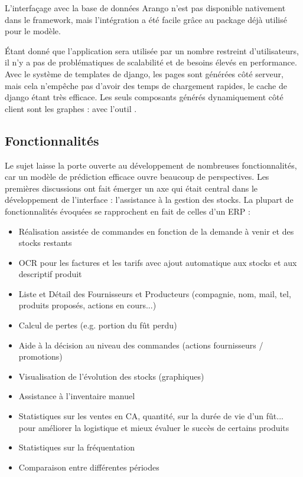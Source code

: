 L'interfaçage avec la base de données Arango n’est pas disponible nativement dans le framework, mais l’intégration a été facile grâce au package  déjà utilisé pour le modèle.

Étant donné que l’application sera utilisée par un nombre restreint d’utilisateurs, il n’y a pas de problématiques de scalabilité et de besoins élevés en performance. Avec le système de templates de django, les pages sont générées côté serveur, mais cela n’empêche pas d’avoir des temps de chargement rapides, le cache de django étant très efficace. Les seuls composants générés dynamiquement côté client sont les graphes : avec l'outil .

\subsection{Fonctionnalités}
\label{subsec:ui_features}

Le sujet laisse la porte ouverte au développement de nombreuses fonctionnalités, car un modèle de prédiction efficace ouvre beaucoup de perspectives. Les premières discussions ont fait émerger un axe qui était central dans le développement de l'interface : l'assistance à la gestion des stocks. La plupart de fonctionnalités évoquées se rapprochent en fait de celles d'un ERP :

\begin{itemize}
    \item Réalisation assistée de commandes en fonction de la demande à venir et des stocks restants
    \item OCR pour les factures et les tarifs avec ajout automatique aux stocks et aux descriptif produit
    \item Liste et Détail des Fournisseurs et Producteurs (compagnie, nom, mail, tel, produits proposés, actions en cours...)
    \item Calcul de pertes (e.g. portion du fût perdu)
    \item Aide à la décision au niveau des commandes (actions fournisseurs / promotions)
    \item Visualisation de l’évolution des stocks (graphiques)
    \item Assistance à l'inventaire manuel
    \item Statistiques sur les ventes en CA, quantité, sur la durée de vie d’un fût... pour améliorer la logistique et mieux évaluer le succès de certains produits
    \item Statistiques sur la fréquentation
    \item Comparaison entre différentes périodes
\end{itemize}

